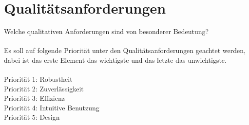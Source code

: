 \chapter{Qualitätsanforderungen}
Welche qualitativen Anforderungen sind von besonderer Bedeutung?\ \\ \\
Es soll auf folgende Priorität unter den Qualitätsanforderungen geachtet werden,
dabei ist das erste Element das wichtigste und das letzte das unwichtigste.\ \\ \\
Priorität 1: Robustheit\ \\
Priorität 2: Zuverlässigkeit\ \\
Priorität 3: Effizienz\ \\
Priorität 4: Intuitive Benutzung\ \\
Priorität 5: Design\ \\ \\
